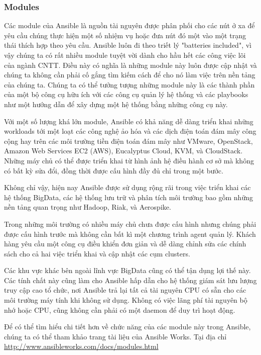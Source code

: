 \subsubsection{Modules}


Các module của Ansible là nguồn tài nguyên được phân phối cho các nút ở xa để yêu cầu chúng thực hiện một số nhiệm vụ hoặc đưa nút đó một vào một trạng thái thích hợp theo yêu cầu. Ansible luôn đi theo triết lý "batteries included", vì vậy chúng ta có rất nhiều module tuyệt vời dành cho hầu hết các công việc lõi của ngành CNTT. Điều này có nghĩa là những module này luôn được cập nhật và chúng ta không cần phải cố gắng tìm kiếm cách để cho nó làm việc trên nền tảng của chúng ta. Chúng ta có thể tưởng tượng những module này là các thành phần của một bộ công cụ hữu ích với các công cụ quản lý hệ thống và các playbooks như một hướng dẫn để xây dựng một hệ thống bằng những công cụ này.

Với một số lượng khá lớn module, Ansible có khả năng dễ dàng triển khai những workloads tới một loạt các công nghệ ảo hóa và các dịch điện toán đám mây công cộng hay trên các môi trường tiền điện toán đám mây như VMware, OpenStack, Amazon Web Services EC2 (AWS), Eucalyptus Cloud, KVM, và CloudStack. Những máy chủ có thể được triển khai từ hình ảnh hệ điều hành cơ sở mà không có bất kỳ sửa đổi, đồng thời được cấu hình đầy đủ chỉ trong một bước.

Không chỉ vậy, hiện nay Ansible được sử dụng rộng rãi trong việc triển khai các hệ thống BigData, các hệ thống lưu trữ và phân tích môi trường bao gồm những nền tảng quan trọng như Hadoop, Riak, và Aerospike.

Trong những môi trường có nhiều máy chủ chưa được cấu hình nhưng chúng phải được cấu hình trước mà không cần bất kì một chương trình agent quản lý. Khách hàng yêu cầu một công cụ điều khiển đơn giản và dễ dàng chỉnh sửa các chính sách cho cả hai việc triển khai và cập nhật các cụm clusters.

Các khu vực khác bên ngoài lĩnh vực BigData cũng có thể tận dụng lợi thế này. Các tính chất này cũng làm cho Ansible hấp dẫn cho hệ thống giám sát lưu lượng truy cập cao tổ chức, nơi Ansible trả lại tất cả tài nguyên CPU có sẵn cho các môi trường máy tính khi không sử dụng. Không có việc lãng phí tài nguyên bộ nhớ hoặc CPU, cũng không cần phải có một daemon để duy trì hoạt động.

Để có thể tìm hiểu chi tiết hơn về chức năng của các module này trong Ansible, chúng ta có thể tham khảo trang tài liệu của Ansible Works. Tại địa chỉ \url{http://www.ansibleworks.com/docs/modules.html}

